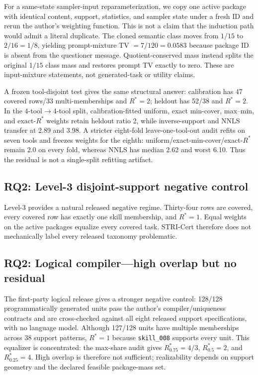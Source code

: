 For a same-state sampler-input reparameterization, we copy one active package with identical content, support, statistics, and sampler state under a fresh ID and rerun the author's weighting function. This is not a claim that the induction path would admit a literal duplicate. The cloned semantic class moves from $1/15$ to $2/16=1/8$, yielding prompt-mixture TV $=7/120=0.0583$ because package ID is absent from the questioner message. Quotient-conserved mass instead splits the original $1/15$ class mass and restores prompt TV exactly to zero. These are input-mixture statements, not generated-task or utility claims.

A frozen tool-disjoint test gives the same structural answer: calibration has 47 covered rows/33 multi-memberships and $R^*=2$; heldout has 52/38 and $R^*=2$. In the 4-tool$\to$4-tool split, calibration-fitted uniform, exact min-cover, max--min, and exact-$R^*$ weights retain heldout ratio 2, while inverse-support and NNLS transfer at 2.89 and 3.98. A stricter eight-fold leave-one-tool-out audit refits on seven tools and freezes weights for the eighth: uniform/exact-min-cover/exact-$R^*$ remain 2.0 on every fold, whereas NNLS has median 2.62 and worst 6.10. Thus the residual is not a single-split refitting artifact.

\subsection{RQ2: Level-3 disjoint-support negative control}
Level-3 provides a natural released negative regime. Thirty-four rows are covered, every covered row has exactly one skill membership, and $R^*=1$. Equal weights on the active packages equalize every covered task. STRI-Cert therefore does not mechanically label every released taxonomy problematic.

\subsection{RQ2: Logical compiler---high overlap but no residual}
The first-party logical release gives a stronger negative control: 128/128 programmatically generated units pass the author's compiler/uniqueness contracts and are cross-checked against all eight released support specifications, with no language model. Although 127/128 units have multiple memberships across 38 support patterns, $R^*=1$ because \texttt{skill\_008} supports every unit. This equalizer is concentrated: the max-share audit gives $R^*_{0.75}=4/3$, $R^*_{0.5}=2$, and $R^*_{0.25}=4$. High overlap is therefore not sufficient; realizability depends on support geometry and the declared feasible package-mass set.

